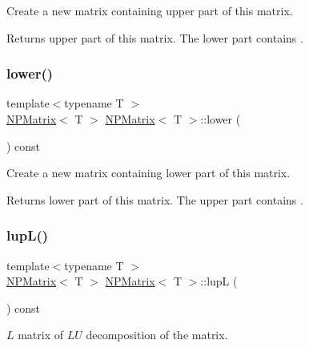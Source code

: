 Create a new matrix containing upper part of this matrix. 

\begin{DoxyReturn}{Returns}
upper part of this matrix. The lower part contains {}. 
\end{DoxyReturn}
\mbox{\label{class_n_p_matrix_a4618b342917acf71c13a89afc2189eaf}} 
\subsubsection{\texorpdfstring{lower()}{lower()}}
{\footnotesize\ttfamily template$<$typename T $>$ \\
\mbox{\hyperlink{class_n_p_matrix}{N\+P\+Matrix}}$<$ T $>$ \mbox{\hyperlink{class_n_p_matrix}{N\+P\+Matrix}}$<$ T $>$\+::lower (\begin{DoxyParamCaption}{ }\end{DoxyParamCaption}) const}



Create a new matrix containing lower part of this matrix. 

\begin{DoxyReturn}{Returns}
lower part of this matrix. The upper part contains {}. 
\end{DoxyReturn}
\mbox{\label{class_n_p_matrix_a21088a7eef02d4d0a0781f616037097a}} 
\subsubsection{\texorpdfstring{lupL()}{lupL()}}
{\footnotesize\ttfamily template$<$typename T $>$ \\
\mbox{\hyperlink{class_n_p_matrix}{N\+P\+Matrix}}$<$ T $>$ \mbox{\hyperlink{class_n_p_matrix}{N\+P\+Matrix}}$<$ T $>$\+::lupL (\begin{DoxyParamCaption}{ }\end{DoxyParamCaption}) const}



$ L $ matrix of $ LU $ decomposition of the matrix. 

\mbox{\label{class_n_p_matrix_a8da21c409841e612b72232d1159eec21}} 
